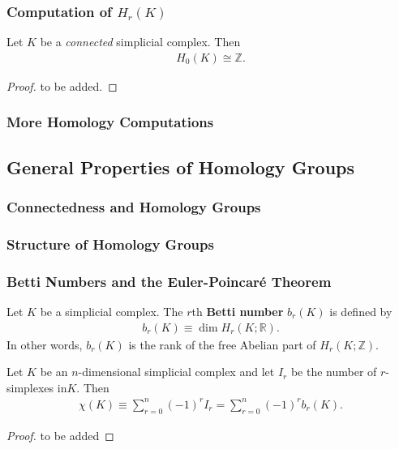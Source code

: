 \documentclass[10pt]{article}
\begin{document}
\subsubsection{Computation of \texorpdfstring{{}$H_r(K)$}{}}
\begin{theorem}
    Let $K$ be a \textit{connected} simplicial complex.
    Then
    \begin{align}
        H_0(K)\cong\mathbb{Z}.
    \end{align}
\end{theorem}
\begin{proof}
    to be added.
\end{proof}

\subsubsection{More Homology Computations}


\subsection{General Properties of Homology Groups}
\subsubsection{Connectedness and Homology Groups}

\subsubsection{Structure of Homology Groups}

\subsubsection{Betti Numbers and the Euler-Poincar\'e Theorem}
\begin{definition}
    Let $K$ be a simplicial complex.
    The $r$th \textbf{Betti number} $b_r(K)$ is defined by
    \begin{align}
        b_r(K)\equiv\dim H_r(K;\mathbb{R}).
    \end{align}
    In other words, $b_r(K)$ is the rank of the free Abelian part of $H_r (K; \mathbb{Z})$.
\end{definition}

\begin{theorem}
    Let $K$ be an $n$-dimensional simplicial complex and let $I_r$ be the number of $r$-simplexes in$K$.
    Then
    \begin{align}
        \chi(K)\equiv\sum_{r=0}^{n}(-1)^r I_r=\sum_{r=0}^n(-1)^r b_r(K).
    \end{align}
\end{theorem}
\begin{proof}
    to be added
\end{proof}
\end{document}
